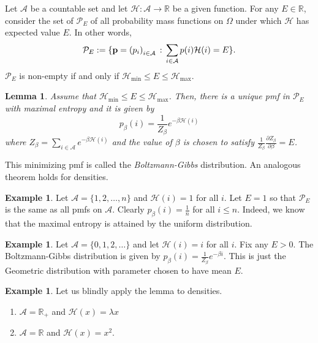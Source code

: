 \documentclass[preprint,  11pt]{amsart}
\newcommand{\para}[1]{\vspace{4mm}\noindent{\bfseries #1:}}
\theoremstyle{plain} %
\newtheorem{lemma}[theorem]{Lemma}
\theoremstyle{definition} %
\newtheorem{example}[theorem]{Example}
\begin{document}
{\para{Gibbs measures} Let ${\mathcal A}$ be a countable set and let ${\mathcal H}:{\mathcal A}\rightarrow \mathbb{R}$ be a given function. For any $E\in \mathbb{R}$, consider the set of ${\mathcal P}_{E}$ of all probability mass functions on $\Omega$ under which ${\mathcal H}$ has expected value $E$. In other words,
$$
{\mathcal P}_{E}:=\{{\bf p}=\left(p_{i}\right)_{i\in {\mathcal A}}{\; : \;} \sum_{i\in {\mathcal A}} p(i){\mathcal H}(i)=E\}.
$$
${\mathcal P}_{E}$ is non-empty if and only if ${\mathcal H}_{\min}\le E\le {\mathcal H}_{\max}$.
\begin{lemma} Assume that ${\mathcal H}_{\min}\le E\le {\mathcal H}_{\max}$. Then, there is a unique pmf in ${\mathcal P}_{E}$ with maximal entropy and it is given by
$$
p_{\beta}(i)=\frac{1}{Z_{\beta}}e^{-\beta {\mathcal H}(i)}
$$ 
where $Z_{\beta}=\sum\limits_{i\in {\mathcal A}}e^{-\beta {\mathcal H}(i)}$ and the value of $\beta$ is chosen to satisfy 
$\frac{1}{Z_{\beta}}\frac{\partial Z_{\beta}}{\partial \beta}=E$.
\end{lemma}
This minimizing pmf is called the {\em Boltzmann-Gibbs} distribution. An analogous theorem holds for densities.

\begin{example} Let ${\mathcal A}=\{1,2,\ldots,n\}$ and ${\mathcal H}(i)=1$ for all $i$. Let $E=1$ so that ${\mathcal P}_{E}$ is the same as all pmfs on ${\mathcal A}$. Clearly $p_{\beta}(i)=\frac{1}{n}$ for all $i\le n$. Indeed, we know that the maximal entropy is attained by the uniform distribution.
\end{example}

\begin{example} Let ${\mathcal A}=\{0,1,2,\ldots\}$ and let ${\mathcal H}(i)=i$ for all $i$. Fix any $E>0$. The Boltzmann-Gibbs distribution is given by $p_{\beta}(i)=\frac{1}{Z_{\beta}}e^{-\beta i}$. This is just the Geometric distribution with parameter chosen to have mean $E$. 
\end{example}

\begin{example} Let us blindly apply the lemma to densities.
\begin{enumerate}\setlength\itemsep{6pt}
\item ${\mathcal A}=\mathbb{R}_{+}$ and ${\mathcal H}(x)=\lambda x$
\item ${\mathcal A}=\mathbb{R}$ and ${\mathcal H}(x)=x^{2}$. 
\end{enumerate}
\end{example}

}
\end{document}
